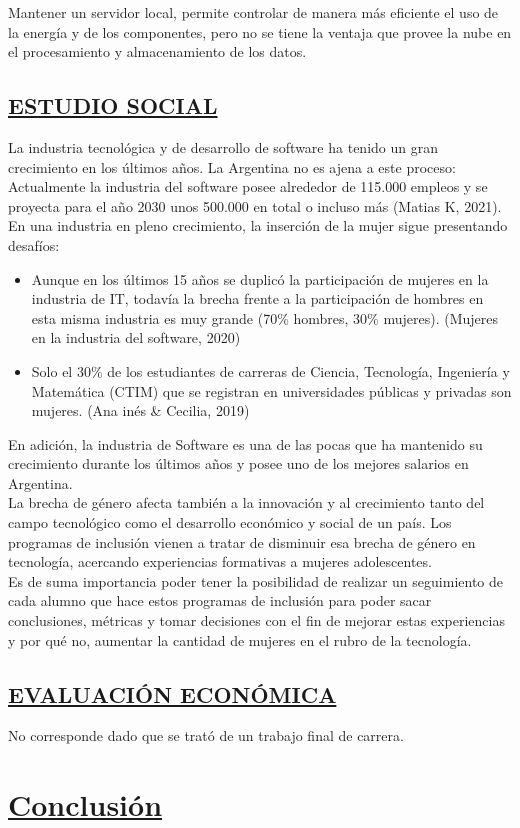 Mantener un servidor local, permite controlar de manera más eficiente el uso de la energía y de los componentes, pero no se tiene la ventaja que provee la nube en el procesamiento y almacenamiento de los datos.\\

\section{\underline{ESTUDIO SOCIAL}}
La industria tecnológica y de desarrollo de software ha tenido un gran crecimiento en los últimos años. La Argentina no es ajena a este proceso: Actualmente la industria del software posee alrededor de 115.000 empleos y se proyecta para el año 2030 unos 500.000 en total o incluso más \textbf{\cite{EmpleosUltAnios}}(Matias K, 2021).\\

En una industria en pleno crecimiento, la inserción de la mujer sigue presentando desafíos:
\begin{itemize}
	\item Aunque en los últimos 15 años se duplicó la participación de mujeres en la industria de IT, todavía la brecha frente a la participación de hombres en esta misma industria es muy grande (70\% hombres, 30\% mujeres).  \textbf{\cite{DuplMujeres}}(Mujeres en la industria del software, 2020)
	\item Solo el 30\% de los estudiantes de carreras de Ciencia, Tecnología, Ingeniería y Matemática (CTIM) que se registran en universidades públicas y privadas son mujeres. \textbf{\cite{MujeresCtim}}(Ana inés \& Cecilia, 2019)\\
\end{itemize}

En adición, la industria de Software es una de las pocas que ha mantenido su crecimiento durante los últimos años y posee uno de los mejores salarios en Argentina.\\

La brecha de género afecta también a la innovación y al crecimiento tanto del campo tecnológico como el desarrollo económico y social de un país. Los programas de inclusión vienen a tratar de disminuir esa brecha de género en tecnología, acercando experiencias formativas a mujeres adolescentes.\\

Es de suma importancia poder tener la posibilidad de realizar un seguimiento de cada alumno que hace estos programas de inclusión para poder sacar conclusiones, métricas y tomar decisiones con el fin de mejorar estas experiencias y por qué no, aumentar la cantidad de mujeres en el rubro de la tecnología. \\

\section{\underline{EVALUACIÓN ECONÓMICA}}
No corresponde dado que se trató de un trabajo final de carrera.

\chapter{\centering \underline{Conclusión}}